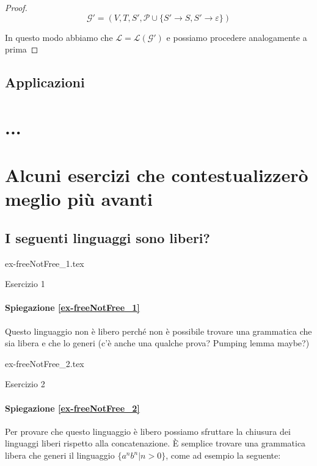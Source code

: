 \documentclass[class=book, crop=false, oneside]{standalone}
\begin{document}
\begin{proof}
   \begin{equation*}
     \mathcal{G}' = (V, T, S', \mathcal{P} \cup \{ S' \rightarrow S, S' \rightarrow \varepsilon \})
   \end{equation*}

   In questo modo abbiamo che \(\mathcal{L} = \mathcal{L(G')}\) e possiamo procedere analogamente a prima

\end{proof}

\subsection{Applicazioni}

\section{...}

\section{Alcuni esercizi che contestualizzerò meglio più avanti}
\subsection*{I seguenti linguaggi sono liberi?}

\begin{table}[H]
	\centering
	{ex-freeNotFree_1.tex}
    \caption{Esercizio 1}
    \label{ex-freeNotFree_1}
\end{table}

\paragraph{Spiegazione \ref{ex-freeNotFree_1}}
Questo linguaggio non è libero perché non è possibile trovare una grammatica che sia libera e che lo generi (c'è anche una qualche prova? Pumping lemma maybe?)

\begin{table}[H]
	\centering
	{ex-freeNotFree_2.tex}
    \caption{Esercizio 2}
    \label{ex-freeNotFree_2}
\end{table}

\paragraph{Spiegazione \ref{ex-freeNotFree_2}}
Per provare che questo linguaggio è libero possiamo sfruttare la chiusura dei linguaggi liberi rispetto alla concatenazione. È semplice trovare una grammatica libera che generi il linguaggio $ \{ a^nb^n | n > 0 \} $, come ad esempio la seguente:
\end{document}
